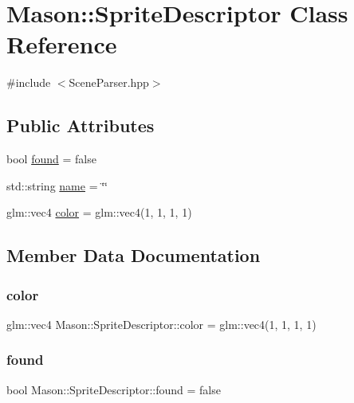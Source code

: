 \hypertarget{class_mason_1_1_sprite_descriptor}{}\section{Mason\+:\+:Sprite\+Descriptor Class Reference}
\label{class_mason_1_1_sprite_descriptor}


{\ttfamily \#include $<$Scene\+Parser.\+hpp$>$}

\subsection*{Public Attributes}
\begin{DoxyCompactItemize}
\item 
bool \hyperlink{class_mason_1_1_sprite_descriptor_a28d5738152a1b83f32846de399ccc4e5}{found} = false
\item 
std\+::string \hyperlink{class_mason_1_1_sprite_descriptor_a78875744bb1e7ba41d6a35ccf83ba43c}{name} = \char`\"{}\char`\"{}
\item 
glm\+::vec4 \hyperlink{class_mason_1_1_sprite_descriptor_a1f3ac0ebe14f163a74f558c421563fbb}{color} = glm\+::vec4(1, 1, 1, 1)
\end{DoxyCompactItemize}


\subsection{Member Data Documentation}
\hypertarget{class_mason_1_1_sprite_descriptor_a1f3ac0ebe14f163a74f558c421563fbb}{}\label{class_mason_1_1_sprite_descriptor_a1f3ac0ebe14f163a74f558c421563fbb} 
\subsubsection{\texorpdfstring{color}{color}}
{\footnotesize\ttfamily glm\+::vec4 Mason\+::\+Sprite\+Descriptor\+::color = glm\+::vec4(1, 1, 1, 1)}

\hypertarget{class_mason_1_1_sprite_descriptor_a28d5738152a1b83f32846de399ccc4e5}{}\label{class_mason_1_1_sprite_descriptor_a28d5738152a1b83f32846de399ccc4e5} 
\subsubsection{\texorpdfstring{found}{found}}
{\footnotesize\ttfamily bool Mason\+::\+Sprite\+Descriptor\+::found = false}

